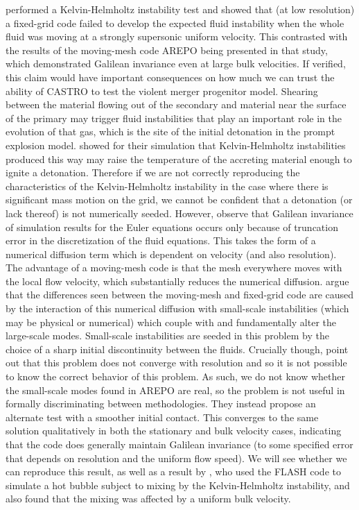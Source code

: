 \documentclass{emulateapj}
\begin{document}
\citet{arepo} performed a Kelvin-Helmholtz instability test and showed
that (at low resolution) a fixed-grid code failed to develop the
expected fluid instability when the whole fluid was moving at a
strongly supersonic uniform velocity. This contrasted with the results
of the moving-mesh code AREPO being presented in that study, which
demonstrated Galilean invariance even at large bulk velocities. If
verified, this claim would have important consequences on how much we
can trust the ability of CASTRO to test the violent merger progenitor
model. Shearing between the material flowing out of the secondary and
material near the surface of the primary may trigger fluid
instabilities that play an important role in the evolution of that
gas, which is the site of the initial detonation in the prompt
explosion model. \citet{guillochon:2010} showed for their simulation
that Kelvin-Helmholtz instabilities produced this way may raise the
temperature of the accreting material enough to ignite a
detonation. Therefore if we are not correctly reproducing the
characteristics of the Kelvin-Helmholtz instability in the case where
there is significant mass motion on the grid, we cannot be confident
that a detonation (or lack thereof) is not numerically
seeded. However, \citet{robertson:2010} observe that Galilean
invariance of simulation results for the Euler equations occurs only
because of truncation error in the discretization of the fluid
equations. This takes the form of a numerical diffusion term which is
dependent on velocity (and also resolution). The advantage of a
moving-mesh code is that the mesh everywhere moves with the local flow
velocity, which substantially reduces the numerical
diffusion. \citeauthor{robertson:2010} argue that the differences seen
between the moving-mesh and fixed-grid code are caused by the
interaction of this numerical diffusion with small-scale instabilities
(which may be physical or numerical) which couple with and
fundamentally alter the large-scale modes. Small-scale instabilities
are seeded in this problem by the choice of a sharp initial
discontinuity between the fluids. Crucially though,
\citeauthor{robertson:2010} point out that this problem does not
converge with resolution and so it is not possible to know the correct
behavior of this problem. As such, we do not know whether the
small-scale modes found in AREPO are real, so the problem is not
useful in formally discriminating between methodologies. They instead
propose an alternate test with a smoother initial contact. This
converges to the same solution qualitatively in both the stationary
and bulk velocity cases, indicating that the code does generally
maintain Galilean invariance (to some specified error that depends on
resolution and the uniform flow speed).  We will see whether we can
reproduce this result, as well as a result by \cite{wadsley:2008}, who
used the FLASH code to simulate a hot bubble subject to mixing by the
Kelvin-Helmholtz instability, and also found that the mixing was
affected by a uniform bulk velocity.
\end{document}
